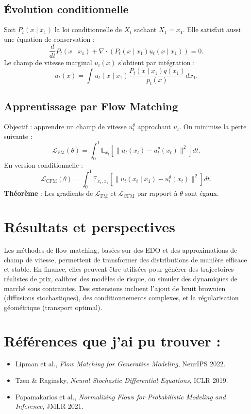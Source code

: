 \documentclass[11pt]{article}
\begin{document}
\subsection{Évolution conditionnelle}
Soit \( P_t(x \mid x_1) \) la loi conditionnelle de \( X_t \) sachant \( X_1 = x_1 \).
Elle satisfait aussi une équation de conservation :
\[
\frac{d}{dt} P_t(x \mid x_1) + \nabla \cdot \left( P_t(x \mid x_1) u_t(x \mid x_1) \right) = 0.
\]
Le champ de vitesse marginal \( u_t(x) \) s'obtient par intégration :
\[
u_t(x) = \int u_t(x \mid x_1) \frac{P_t(x \mid x_1) q(x_1)}{p_t(x)} dx_1.
\]

\subsection{Apprentissage par Flow Matching}
Objectif : apprendre un champ de vitesse \( u_t^\theta \) approchant \( u_t \).
On minimise la perte suivante :
\[
\mathcal{L}_{\text{FM}}(\theta) = \int_0^1 \mathbb{E}_{x_t} \left[ \| u_t(x_t) - u_t^\theta(x_t) \|^2 \right] dt.
\]
En version conditionnelle :
\[
\mathcal{L}_{\text{CFM}}(\theta) = \int_0^1 \mathbb{E}_{x_t, x_1} \left[ \| u_t(x_t \mid x_1) - u_t^\theta(x_t) \|^2 \right] dt.
\]
\textbf{Théorème} : Les gradients de \( \mathcal{L}_{\text{FM}} \) et \( \mathcal{L}_{\text{CFM}} \) par rapport à \( \theta \) sont égaux.

\section{Résultats et perspectives}
Les méthodes de flow matching, basées sur des EDO et des approximations de champ de vitesse, permettent de transformer des distributions de manière efficace et stable.
En finance, elles peuvent être utilisées pour générer des trajectoires réalistes de prix, calibrer des modèles de risque, ou simuler des dynamiques de marché sous contraintes.
Des extensions incluent l'ajout de bruit brownien (diffusions stochastiques), des conditionnements complexes, et la régularisation géométrique (transport optimal).

\section*{Références que j'ai pu trouver :}
\begin{itemize}
    \item Lipman et al., \textit{Flow Matching for Generative Modeling}, NeurIPS 2022.
    \item Tzen \& Raginsky, \textit{Neural Stochastic Differential Equations}, ICLR 2019.
    \item Papamakarios et al., \textit{Normalizing Flows for Probabilistic Modeling and Inference}, JMLR 2021.
\end{itemize}
\end{document}

